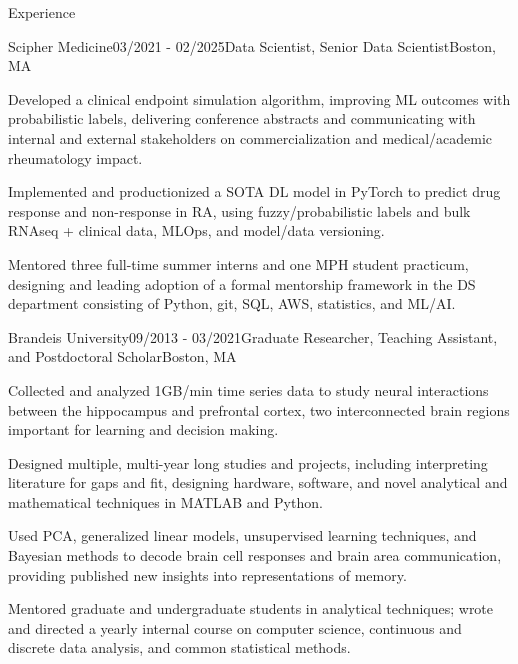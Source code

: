 \documentclass{resume} %
\begin{document}
\begin{rSection}{Experience}
\begin{rSubsection}{Scipher Medicine}{03/2021 - 02/2025}{Data Scientist, Senior Data Scientist}{Boston, MA}
\item Developed a clinical endpoint simulation algorithm, improving ML outcomes with probabilistic labels, delivering conference abstracts and communicating with internal and external stakeholders on commercialization and medical/academic rheumatology impact.

\item Implemented and productionized a SOTA DL model in PyTorch to predict drug response and non-response in RA, using fuzzy/probabilistic labels and bulk RNAseq + clinical data, MLOps, and model/data versioning.

\item Mentored three full-time summer interns and one MPH student practicum, designing and leading adoption of a formal mentorship framework in the DS department consisting of Python, git, SQL, AWS, statistics, and ML/AI.

\end{rSubsection}


\begin{rSubsection}{Brandeis University}{09/2013 - 03/2021}{Graduate Researcher, Teaching Assistant, and Postdoctoral Scholar}{Boston, MA}

\item Collected and analyzed 1GB/min time series data to study neural interactions between the hippocampus and prefrontal cortex, two interconnected brain regions important for learning and decision making.

\item Designed multiple, multi-year long studies and projects, including interpreting literature for gaps and fit, designing hardware, software, and novel analytical and mathematical techniques in MATLAB and Python.

\item Used PCA, generalized linear models, unsupervised learning techniques, and Bayesian methods to decode brain cell responses and brain area communication,
providing published new insights into representations of memory.

\item Mentored graduate and undergraduate students in analytical techniques; wrote and directed a yearly internal course on computer science, continuous and discrete data analysis, and common statistical methods.
\end{rSubsection}


\end{rSection}
\end{document}
